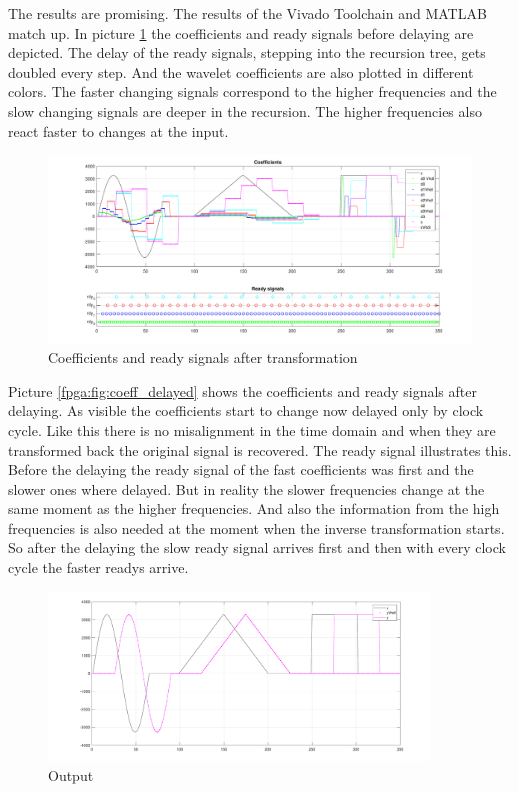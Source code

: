 \begin{refsection}
The results are promising. The results of the Vivado Toolchain and MATLAB match up. 
In picture \ref{fpga:fig:coeff} the coefficients and ready signals before delaying are depicted.
The delay of the ready signals, stepping into the recursion tree, gets doubled every step. 
And the wavelet coefficients are also plotted in different colors. 
The faster changing signals correspond to the higher frequencies and the slow changing signals are deeper in the recursion.
The higher frequencies also react faster to changes at the input.
\begin{figure}
	\centering
	\includegraphics[width=\textwidth]{papers/fpga/images/coefs.pdf}
	\caption{Coefficients and ready signals after transformation \label{fpga:fig:coeff}}
\end{figure}

Picture \ref{fpga:fig:coeff_delayed} shows the coefficients and ready signals after delaying. 
As visible the coefficients start to change now delayed only by clock cycle. 
Like this there is no misalignment in the time domain and when they are transformed back the original signal is recovered. 
The ready signal illustrates this. 
Before the delaying the ready signal of the fast coefficients was first and the slower ones where delayed. 
But in reality the slower frequencies change at the same moment as the higher frequencies. 
And also the information from the high frequencies is also needed at the moment when the inverse transformation starts. 
So after the delaying the slow ready signal arrives first and then with every clock cycle the faster readys arrive. 
\begin{figure}[h]
	\centering
	\includegraphics[width=0.9\textwidth]{papers/fpga/images/output.pdf}
	\caption{Output \label{fpga:fig:output}}
\end{figure}


\end{refsection}
